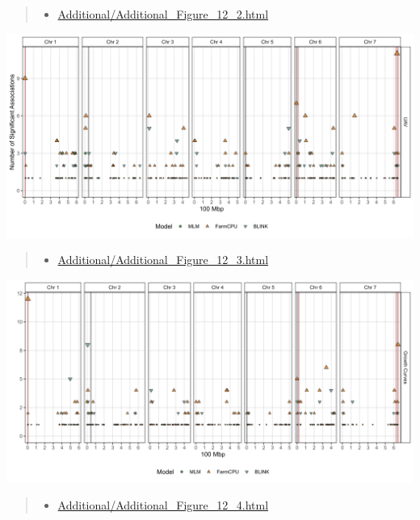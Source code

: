 \documentclass[
]{article}
\providecommand{\tightlist}{%
  \setlength{\itemsep}{0pt}\setlength{\parskip}{0pt}}
\begin{document}
\begin{quote}
\begin{itemize}
\tightlist
\item
  \href{https://derekmichaelwright.github.io/AGILE_LDP_UAV/Additional/Additional_Figure_12_2.html}{Additional/Additional\_Figure\_12\_2.html}
\end{itemize}
\end{quote}

\includegraphics{Additional/Additional_Figure_12_2.png}

\pagebreak

\begin{quote}
\begin{itemize}
\tightlist
\item
  \href{https://derekmichaelwright.github.io/AGILE_LDP_UAV/Additional/Additional_Figure_12_3.html}{Additional/Additional\_Figure\_12\_3.html}
\end{itemize}
\end{quote}

\includegraphics{Additional/Additional_Figure_12_3.png}

\begin{quote}
\begin{itemize}
\tightlist
\item
  \href{https://derekmichaelwright.github.io/AGILE_LDP_UAV/Additional/Additional_Figure_12_4.html}{Additional/Additional\_Figure\_12\_4.html}
\end{itemize}
\end{quote}
\end{document}
